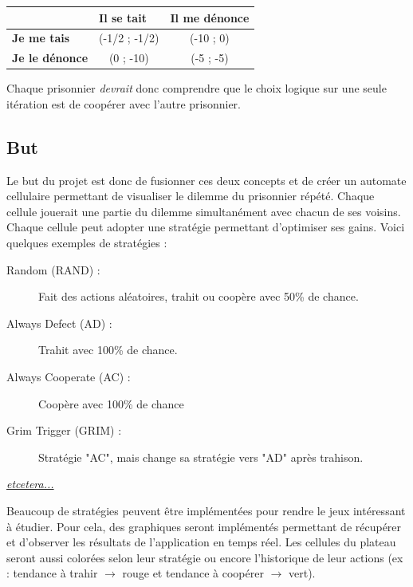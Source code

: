 \documentclass[a4paper, french]{article}
\begin{document}
\begin{framed}
        \begin{center}
            \begin{tabular}{|l|c|c|}
            \hline
            \textbf{} & \multicolumn{1}{l|}{\textbf{Il se tait}} & \multicolumn{1}{l|}{\textbf{Il me dénonce}} \\ \hline
            \textbf{Je me tais}         & (-1/2 ; -1/2)                            & (-10 ; 0)                                   \\ \hline
            \textbf{Je le dénonce}      & (0 ; -10)                                & (-5 ; -5)                                   \\ \hline
            \end{tabular}
        \end{center}
        
        Chaque prisonnier \textit{devrait} donc comprendre que le choix logique sur une seule itération est de coopérer avec l'autre prisonnier.
\end{framed}

\subsection{But}
Le but du projet est donc de fusionner ces deux concepts et de créer un automate cellulaire permettant de visualiser le dilemme du prisonnier répété. Chaque cellule jouerait une partie du dilemme simultanément avec chacun de ses voisins. Chaque cellule peut adopter une stratégie permettant d'optimiser ses gains. Voici quelques exemples de stratégies :
\begin{framed}
    \begin{description}
        \item[Random (RAND) : ] Fait des actions aléatoires, trahit ou coopère avec 50\% de chance.
        \item[Always Defect (AD) : ] Trahit avec 100\% de chance.
        \item[Always Cooperate (AC) : ] Coopère avec 100\% de chance
        \item[Grim Trigger (GRIM) : ] Stratégie "AC", mais change sa stratégie vers "AD" après trahison.
        \item[\href{http://www.iterated-prisoners-dilemma.net/prisoners-dilemma-strategies.shtml}{\textit{etcetera...}}] \cite{StratIPD}
    \end{description}
\end{framed}

Beaucoup de stratégies peuvent être implémentées pour rendre le jeux intéressant à étudier. Pour cela, des graphiques seront implémentés permettant de récupérer et d'observer les résultats de l'application en temps réel. Les cellules du plateau seront aussi colorées selon leur stratégie ou encore l'historique de leur actions (ex : tendance à trahir $\rightarrow{}$ rouge et tendance à coopérer $\rightarrow{}$ vert).
\end{document}
